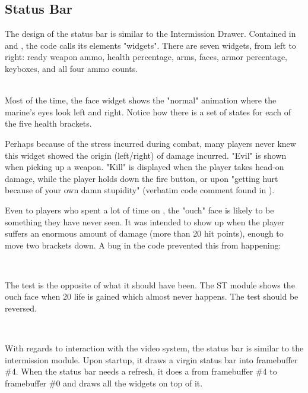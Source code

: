 \par

\subsection{Status Bar}
The design of the status bar is similar to the Intermission Drawer. Contained in  and , the code calls its elements "widgets". There are seven widgets, from left to right: ready weapon ammo, health percentage, arms, faces, armor percentage, keyboxes, and all four ammo counts.\\
\par
{}
\par

\par
{}\\
Most of the time, the face widget shows the "normal" animation where the marine's eyes look left and right. Notice how there is a set of states for each of the five health brackets.\\
\par
 Perhaps because of the stress incurred during combat, many players never knew this widget showed the origin (left/right) of damage incurred. "Evil" is shown when picking up a weapon. "Kill" is displayed when the player takes head-on damage, while the player holds down the fire button, or upon "getting hurt because of your own damn stupidity" (verbatim code comment found in ).\\
\par
Even to players who spent a lot of time on \doom, the "ouch" face is likely to be something they have never seen. It was intended to show up when the player suffers an enormous amount of damage (more than 20 hit points), enough to move two brackets down. A bug in the code prevented this from happening:\\
\par
{}\\
\par
The test is the opposite of what it should have been. The ST module shows the ouch face when 20 life is gained which almost never happens. The test should be reversed.\\
\par
{}\\
\par
With regards to interaction with the video system, the status bar is similar to the intermission module. Upon startup, it draws a virgin status bar into framebuffer \#4. When the status bar needs a refresh, it does a  from framebuffer \#4 to framebuffer \#0 and draws all the widgets on top of it.\\
\par
{}
